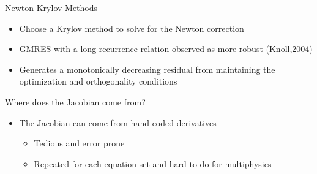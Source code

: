 \documentclass{beamer}
\begin{document}
\begin{frame}{Newton-Krylov Methods}

  \begin{itemize}
  \item Choose a Krylov method to solve for the Newton correction
    \medskip
  \item GMRES with a long recurrence relation observed as more
    robust (Knoll,2004)
    \medskip
  \item Generates a monotonically decreasing residual from
    maintaining the optimization and orthogonality conditions
  \end{itemize}

  \medskip \medskip \medskip
  \pause Where does the Jacobian come from?
  \begin{itemize}
  \item The Jacobian can come from hand-coded derivatives
    \begin{itemize}
    \item Tedious and error prone
    \item Repeated for each equation set and hard to do for
      multiphysics
    \end{itemize}
  \end{itemize} 

\end{frame}
\end{document}

